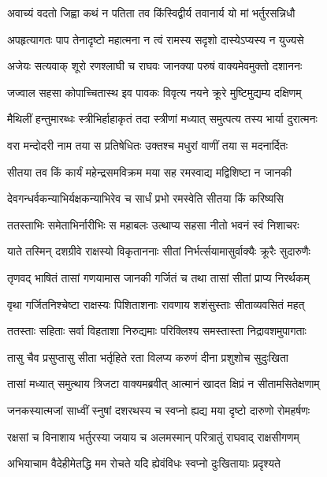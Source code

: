 \twolineshloka
{अवाच्यं वदतो जिह्वा कथं न पतिता तव}
{किंस्विद्वीर्य तवानार्य यो मां भर्तुरसन्निधौ} %

\twolineshloka
{अपहृत्यागतः पाप तेनादृष्टो महात्मना}
{न त्वं रामस्य सदृशो दास्येऽप्यस्य न युज्यसे} %

\twolineshloka
{अजेयः सत्यवाक् शूरो रणश्लाघी च राघवः}
{जानक्या परुषं वाक्यमेवमुक्तो दशाननः} %

\twolineshloka
{जज्वाल सहसा कोपाच्चितास्थ इव पावकः}
{विवृत्य नयने क्रूरे मुष्टिमुद्यम्य दक्षिणम्} %

\twolineshloka
{मैथिलीं हन्तुमारब्धः स्त्रीभिर्हाहाकृतं तदा}
{स्त्रीणां मध्यात् समुत्पत्य तस्य भार्या दुरात्मनः} %

\twolineshloka
{वरा मन्दोदरी नाम तया स प्रतिषेधितः}
{उक्तश्च मधुरां वाणीं तया स मदनार्दितः} %

\twolineshloka
{सीतया तव किं कार्यं महेन्द्रसमविक्रम}
{मया सह रमस्वाद्य मद्विशिष्टा न जानकी} %

\twolineshloka
{देवगन्धर्वकन्याभिर्यक्षकन्याभिरेव च}
{सार्धं प्रभो रमस्वेति सीतया किं करिष्यसि} %

\twolineshloka
{ततस्ताभिः समेताभिर्नारीभिः स महाबलः}
{उत्थाप्य सहसा नीतो भवनं स्वं निशाचरः} %

\twolineshloka
{याते तस्मिन् दशग्रीवे राक्षस्यो विकृताननाः}
{सीतां निर्भर्त्सयामासुर्वाक्यैः क्रूरैः सुदारुणैः} %

\twolineshloka
{तृणवद् भाषितं तासां गणयामास जानकी}
{गर्जितं च तथा तासां सीतां प्राप्य निरर्थकम्} %

\twolineshloka
{वृथा गर्जितनिश्चेष्टा राक्षस्यः पिशिताशनाः}
{रावणाय शशंसुस्ताः सीताव्यवसितं महत्} %

\twolineshloka
{ततस्ताः सहिताः सर्वा विहताशा निरुद्यमाः}
{परिक्लिश्य समस्तास्ता निद्रावशमुपागताः} %

\twolineshloka
{तासु चैव प्रसुप्तासु सीता भर्तृहिते रता}
{विलप्य करुणं दीना प्रशुशोच सुदुःखिता} %

\twolineshloka
{तासां मध्यात् समुत्थाय त्रिजटा वाक्यमब्रवीत्}
{आत्मानं खादत क्षिप्रं न सीतामसितेक्षणाम्} %

\twolineshloka
{जनकस्यात्मजां साध्वीं स्नुषां दशरथस्य च}
{स्वप्नो ह्यद्य मया दृष्टो दारुणो रोमहर्षणः} %

\twolineshloka
{रक्षसां च विनाशाय भर्तुरस्या जयाय च}
{अलमस्मान् परित्रातुं राघवाद् राक्षसीगणम्} %

\twolineshloka
{अभियाचाम वैदेहीमेतद्धि मम रोचते}
{यदि ह्येवंविधः स्वप्नो दुःखितायाः प्रदृश्यते} %

